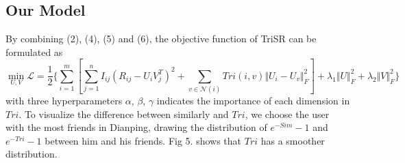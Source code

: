 \documentclass{article}
\begin{document}
\subsection{Our Model}
By combining (2), (4), (5) and (6), the objective function of TriSR can be formulated as
\begin{equation}
  \min_{U, V} \mathcal{L} = \frac{1}{2} \{\sum_{i=1}^m [\sum_{j=1}^n I_{ij} (R_{ij} - U_iV_j^T)^2 + \sum_{v \in \mathcal{N}(i)} Tri(i, v) \Vert U_i - U_v \Vert_F^2 ] + \lambda_1 \Vert U \Vert_F^2 + \lambda_2 \Vert V \Vert_F^2 \}
\end{equation}
with three hyperparameters $\alpha$, $\beta$, $\gamma$ indicates the importance of each dimension in $Tri$. 
To visualize the difference between similarly and $Tri$, we choose the user with the most friends in Dianping, drawing the distribution 
of $e^{-Sim}-1$ and $e^{-Tri}-1$ between him and his friends. Fig 5. shows that $Tri$ has a smoother distribution.
\end{document}
